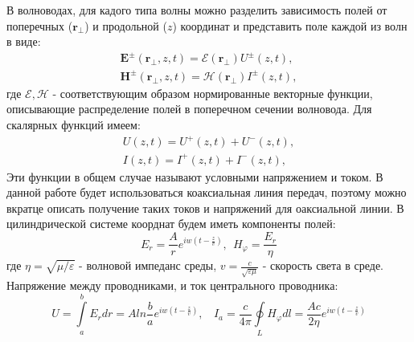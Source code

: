 В волноводах, для кадого типа волны можно разделить зависимость полей от поперечных ($\textbf{r}_{\bot}$) и продольной
($z$) координат и представить поле каждой из волн в виде:
\begin{equation}
    \begin{split}
        \textbf{E}^{\pm}(\textbf{r}_{\bot},z,t) = \mathcal{E} (\textbf{r}_{\bot}) U^{\pm}(z,t),\\
        \textbf{H}^{\pm}(\textbf{r}_{\bot},z,t) = \mathcal{H} (\textbf{r}_{\bot}) I^{\pm}(z,t),  
    \end{split}
    \label{eq:3}
\end{equation}
где $ \mathcal{E}, \mathcal{H}$ - соответствующим образом нормированные векторные функции, описывающие распределение
полей в поперечном сечении волновода. Для скалярных функций имеем:
\begin{equation}
    \begin{split}
        U(z,t) = U^+(z,t)+U^-(z,t),\\
        I(z,t) = I^+(z,t)+I^-(z,t),  
    \end{split}
    \label{eq:4}
\end{equation}
Эти функции в общем случае называют условными напряжением и током. В данной работе будет использоваться коаксиальная
линия передач, поэтому можно вкратце описать получение таких токов и напряжений для оаксиальной линии.
В цилиндрической системе коорднат будем иметь компоненты полей: 
\begin{equation}
    E_r = \frac{A}{r} e^{iw(t-\frac{z}{v})},~~ H_{\varphi} = \frac{E_r}{\eta}
    \label{eq:5}
\end{equation}
где $\eta = \sqrt{\mu / \varepsilon}$ - волновой импеданс среды, $v = \frac{c}{\sqrt{\varepsilon \mu}}$ - скорость света в
среде. Напряжение между проводниками, и ток центрального проводника:
\begin{equation}
    U = \int \limits_a^b E_r dr = A ln \frac{b}{a} e^{iw(t-\frac{z}{v})},~~~~
    I_a = \frac{c}{4 \pi } \oint \limits_L H_{\varphi} dl = \frac{A c}{2 \eta} e^{iw(t-\frac{z}{v})}
    \label{eq:6}
\end{equation}

